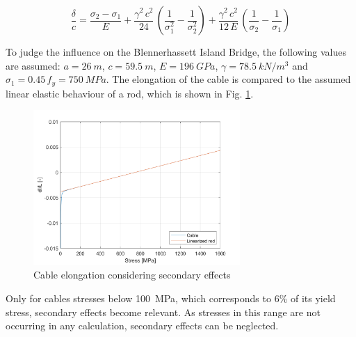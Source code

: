 \begin{equation}
    \frac{\delta}{c}= \frac{\sigma_2-\sigma_1}{E} 
    + \frac{\gamma^2\,c^2}{24}\,\left(\frac{1}{\sigma_1^2} -\frac{1}{\sigma_2^2} \right) 
    + \frac{\gamma^2\,c^2}{12\,E}\,\left(\frac{1}{\sigma_2} -\frac{1}{\sigma_1} \right)
    \label{eq:cable}
\end{equation}

To judge the influence on the Blennerhassett Island Bridge, the following values are assumed: $a=\SI{26}{m}$, $c=\SI{59.5}{m}$, $E=\SI{196}{GPa}$, $\gamma=\SI{78.5}{kN/m^3}$ and $\sigma_1=0.45\,f_y=\SI{750}{MPa}$. The elongation of the cable is compared to the assumed linear elastic behaviour of a rod, which is shown in Fig. \ref{fig:hanger_approximation}.

\begin{figure}[H]
    \centering
    \includegraphics[width=0.7\textwidth]{overleaf/Appendix/Pictures/hanger_approximation.png}
    \caption{Cable elongation considering secondary effects}
    \label{fig:hanger_approximation}
\end{figure}

Only for cables stresses below \SI{100}{MPa}, which corresponds to 6\% of its yield stress, secondary effects become relevant. As stresses in this range are not occurring in any calculation, secondary effects can be neglected.

\newpage
